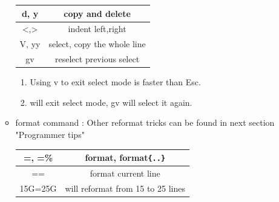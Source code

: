 \documentclass[a4paper,12pt,twoside]{book}
\begin{document}
\begin{itemize}
\begin{itemize}
\begin{center}
\begin{tabular}{c|c}
		\hline 
		d, y & copy and delete\\

		\hline
		<,> & indent left,right\\

		\hline
		V, yy & select, copy the whole line  \\

		\hline
		gv & reselect previous select
		
			\end{tabular}
	\end{center}

	\begin{enumerate}
			\item Using v to exit select mode is faster than Esc. 
			\item <,> will exit select mode, gv will select it again. 
	\end{enumerate}					
	
	\item format command : Other reformat tricks can be found in next section "Programmer tips" 
 \begin{center}
        \begin{tabular}{c|c}
		\hline 
		=, =\% & format, format\verb={..}=\\

		\hline
		== & format current line \\ 
		\hline 
		15G=25G & will reformat from 15 to 25 lines
		

\end{tabular}
\end{center}
\end{itemize}
\end{itemize}
\end{document}
